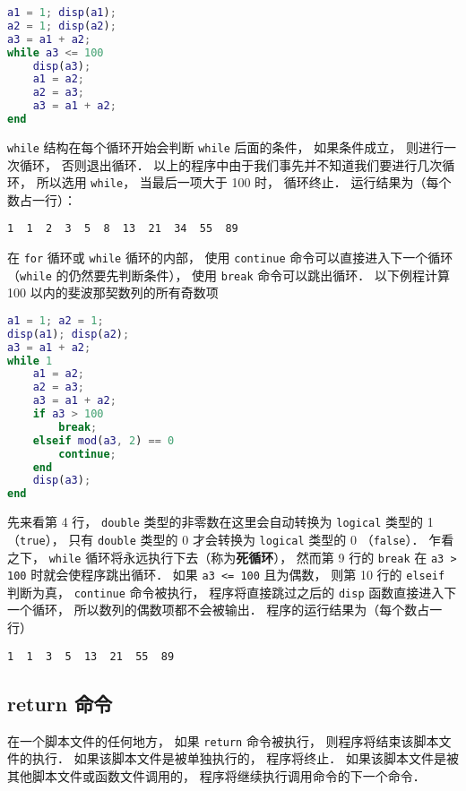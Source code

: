 \begin{lstlisting}[language=matlab, caption=fibonacci.m]
a1 = 1; disp(a1); 
a2 = 1; disp(a2);
a3 = a1 + a2;
while a3 <= 100
    disp(a3);
    a1 = a2;
    a2 = a3;
    a3 = a1 + a2;
end
\end{lstlisting}

\verb|while| 结构在每个循环开始会判断 \verb|while| 后面的条件， 如果条件成立， 则进行一次循环， 否则退出循环． 以上的程序中由于我们事先并不知道我们要进行几次循环， 所以选用 \verb|while|， 当最后一项大于 100 时， 循环终止． 运行结果为（每个数占一行）：
\begin{lstlisting}[language=matlabC]
1  1  2  3  5  8  13  21  34  55  89
\end{lstlisting}

在 \verb|for| 循环或 \verb|while| 循环的内部， 使用 \verb|continue| 命令可以直接进入下一个循环（\verb|while| 的仍然要先判断条件）， 使用 \verb|break| 命令可以跳出循环． 以下例程计算 100 以内的斐波那契数列的所有奇数项

\begin{lstlisting}[language=matlab, caption=fibonacciOdd.m]
a1 = 1; a2 = 1;
disp(a1); disp(a2);
a3 = a1 + a2;
while 1
    a1 = a2;
    a2 = a3;
    a3 = a1 + a2;
    if a3 > 100
        break;
    elseif mod(a3, 2) == 0
        continue;
    end
    disp(a3);
end
\end{lstlisting}

先来看第 4 行， \verb|double| 类型的非零数在这里会自动转换为 \verb|logical| 类型的 1 （\verb|true|）， 只有 \verb|double| 类型的 0 才会转换为 \verb|logical| 类型的 0 （\verb|false|）． 乍看之下， \verb|while| 循环将永远执行下去（称为\textbf{死循环}）， 然而第 9 行的 \verb|break| 在 \verb|a3 > 100| 时就会使程序跳出循环． 如果 \verb|a3 <= 100| 且为偶数， 则第 10 行的 \verb|elseif| 判断为真， \verb|continue| 命令被执行， 程序将直接跳过之后的 \verb|disp| 函数直接进入下一个循环， 所以数列的偶数项都不会被输出． 程序的运行结果为（每个数占一行）
\begin{lstlisting}[language=matlabC]
1  1  3  5  13  21  55  89
\end{lstlisting}

\subsection{return 命令}
在一个脚本文件的任何地方， 如果 \verb|return| 命令被执行， 则程序将结束该脚本文件的执行． 如果该脚本文件是被单独执行的， 程序将终止． 如果该脚本文件是被其他脚本文件或函数文件调用的， 程序将继续执行调用命令的下一个命令．
